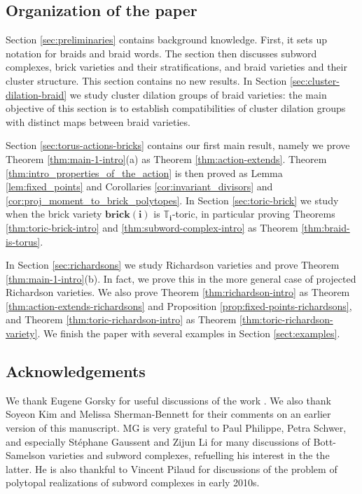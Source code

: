 \documentclass[a4paper, 11pt]{amsart}
\newcommand{\brick}{\mathbf{brick}}
\newcommand{\word}[1]{\mathbf{#1}}
\newcommand{\dil}[1]{\mathbb{T}_{#1}}
\theoremstyle{definition}
\begin{document}
\subsection{Organization of the paper} Section \ref{sec:preliminaries} contains background knowledge. First, it sets up notation for braids and braid words. The section then discusses subword complexes, brick varieties and their stratifications, and braid varieties and their cluster structure. This section contains no new results. In Section \ref{sec:cluster-dilation-braid} we study cluster dilation groups of braid varieties: the main objective of this section is to establish compatibilities of cluster dilation groups with distinct maps between braid varieties. 

Section \ref{sec:torus-actions-bricks} contains our first main result, namely we prove Theorem \ref{thm:main-1-intro}(a) as Theorem \ref{thm:action-extends}. Theorem \ref{thm:intro_properties_of_the_action} is then proved as Lemma \ref{lem:fixed_points} and Corollaries \ref{cor:invariant_divisors} and \ref{cor:proj_moment_to_brick_polytopes}. In Section \ref{sec:toric-brick} we study when the brick variety $\brick(\word{i})$ is $\dil{\word{i}}$-toric, in particular proving Theorems \ref{thm:toric-brick-intro} and \ref{thm:subword-complex-intro} as Theorem \ref{thm:braid-is-torus}. 

In Section \ref{sec:richardsons} we study Richardson varieties and prove Theorem \ref{thm:main-1-intro}(b). In fact, we prove this in the more general case of projected Richardson varieties. We also prove Theorem \ref{thm:richardson-intro} as Theorem \ref{thm:action-extends-richardsons} and Proposition \ref{prop:fixed-points-richardsons},  and Theorem \ref{thm:toric-richardson-intro} as Theorem \ref{thm:toric-richardson-variety}. We finish the paper with several examples in Section \ref{sect:examples}. 

\subsection*{Acknowledgements}

We thank Eugene Gorsky for useful discussions of the work \cite{GKSB}. We also thank Soyeon Kim and Melissa Sherman-Bennett for their comments on an earlier version of this manuscript. MG is very grateful to Paul Philippe, Petra Schwer, and especially Stéphane Gaussent and Zijun Li for many discussions of Bott-Samelson varieties and subword complexes, refuelling his interest in the the latter. He is also thankful to Vincent Pilaud for discussions of the problem of polytopal realizations of subword complexes in early 2010s.
\end{document}
